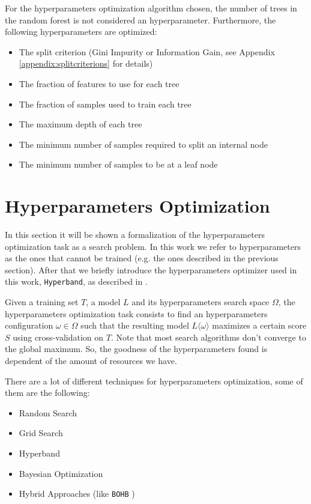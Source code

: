 \documentclass[11pt, a4paper]{article}
\begin{document}
    For the hyperparameters optimization algorithm chosen, the number of trees in the random forest is not considered an hyperparameter.
    Furthermore, the following hyperparameters are optimized:
    \begin{itemize}
      \item The split criterion (Gini Impurity or Information Gain, see Appendix \ref{appendix:splitcriterions} for details)
      \item The fraction of features to use for each tree
      \item The fraction of samples used to train each tree
      \item The maximum depth of each tree
      \item The minimum number of samples required to split an internal node
      \item The minimum number of samples to be at a leaf node
    \end{itemize}

\clearpage

\section{Hyperparameters Optimization}
  In this section it will be shown a formalization of the hyperparameters optimization task as a search problem.
  In this work we refer to hyperparameters as the ones that cannot be trained (e.g. the ones described in the previous section).
  After that we briefly introduce the hyperparameters optimizer used in this work, \texttt{Hyperband}, as described in \cite{hyperband}.

  Given a training set $T$, a model $L$ and its hyperparameters search space $\Omega$, the hyperparameters optimization task consists to find an hyperparameters configuration $\omega \in \Omega$ such that the resulting model $L\langle\omega\rangle$ maximizes a certain score $S$ using cross-validation on $T$.
  Note that most search algorithms don't converge to the global maximum.
  So, the goodness of the hyperparameters found is dependent of the amount of resources we have.

  There are a lot of different techniques for hyperparameters optimization, some of them are the following:
  \begin{itemize}
    \item Random Search
    \item Grid Search
    \item Hyperband
    \item Bayesian Optimization
    \item Hybrid Approaches (like \texttt{BOHB} \cite{bohb})
  \end{itemize}
\end{document}
